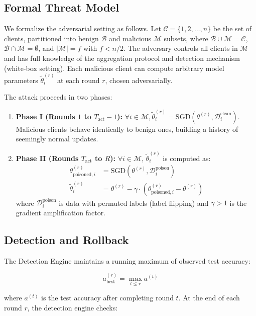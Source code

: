 \documentclass[conference]{IEEEtran}
\newcommand{\B}{\mathcal{B}}
\newcommand{\M}{\mathcal{M}}
\begin{document}
\subsection{Formal Threat Model}
We formalize the adversarial setting as follows. Let $\mathcal{C} = \{1,2,\dots,n\}$ be the set of clients, partitioned into benign $\B$ and malicious $\M$ subsets, where $\B \cup \M = \mathcal{C}$, $\B \cap \M = \emptyset$, and $|\M| = f$ with $f < n/2$. The adversary controls all clients in $\M$ and has full knowledge of the aggregation protocol and detection mechanism (white-box setting). Each malicious client can compute arbitrary model parameters $\tilde{\theta}_i^{(r)}$ at each round $r$, chosen adversarially.

The attack proceeds in two phases:
\begin{enumerate}
    \item \textbf{Phase I (Rounds $1$ to $T_{\text{act}} - 1$):} $\forall i \in \M, \tilde{\theta}_i^{(r)} = \text{SGD}(\theta^{(r)}, \mathcal{D}_i^{\text{clean}})$. Malicious clients behave identically to benign ones, building a history of seemingly normal updates.
    \item \textbf{Phase II (Rounds $T_{\text{act}}$ to $R$):} $\forall i \in \M$, $\tilde{\theta}_i^{(r)}$ is computed as:
    \begin{align}
        \theta_{\text{poisoned},i}^{(r)} &= \text{SGD}(\theta^{(r)}, \mathcal{D}_i^{\text{poison}}) \\
        \tilde{\theta}_i^{(r)} &= \theta^{(r)} - \gamma \cdot (\theta_{\text{poisoned},i}^{(r)} - \theta^{(r)})
    \end{align}
    where $\mathcal{D}_i^{\text{poison}}$ is data with permuted labels (label flipping) and $\gamma > 1$ is the gradient amplification factor.
\end{enumerate}

\subsection{Detection and Rollback}
The Detection Engine maintains a running maximum of observed test accuracy:

\begin{equation}
a_{\text{best}}^{(r)} = \max_{t \leq r} a^{(t)}
\end{equation}

where $a^{(t)}$ is the test accuracy after completing round $t$. At the end of each round $r$, the detection engine checks:
\end{document}
